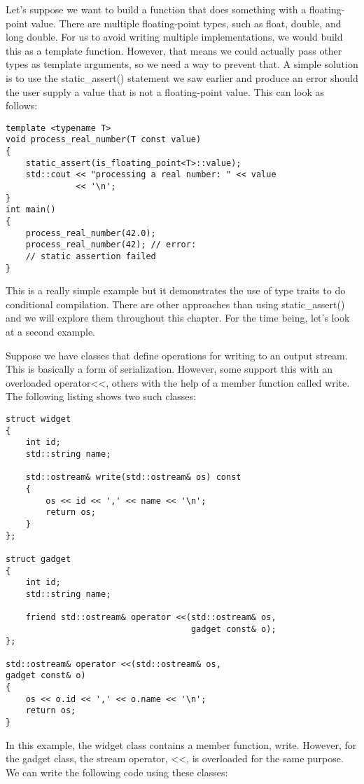 Let’s suppose we want to build a function that does something with a floating-point value. There are multiple floating-point types, such as float, double, and long double. For us to avoid writing multiple implementations, we would build this as a template function. However, that means we could actually pass other types as template arguments, so we need a way to prevent that. A simple solution is to use the static\_assert() statement we saw earlier and produce an error should the user supply a value that is not a floating-point value. This can look as follows:

\begin{lstlisting}[style=styleCXX]
template <typename T>
void process_real_number(T const value)
{
	static_assert(is_floating_point<T>::value);
	std::cout << "processing a real number: " << value
			  << '\n';
}
int main()
{
	process_real_number(42.0);
	process_real_number(42); // error:
	// static assertion failed
}
\end{lstlisting}

This is a really simple example but it demonstrates the use of type traits to do conditional compilation. There are other approaches than using static\_assert() and we will explore them throughout this chapter. For the time being, let’s look at a second example.

Suppose we have classes that define operations for writing to an output stream. This is basically a form of serialization. However, some support this with an overloaded operator<{}<, others with the help of a member function called write. The following listing shows two such classes:

\begin{lstlisting}[style=styleCXX]
struct widget
{
	int id;
	std::string name;
	
	std::ostream& write(std::ostream& os) const
	{
		os << id << ',' << name << '\n';
		return os;
	}
};

struct gadget
{
	int id;
	std::string name;
	
	friend std::ostream& operator <<(std::ostream& os,
	                                 gadget const& o);
};

std::ostream& operator <<(std::ostream& os,
gadget const& o)
{
	os << o.id << ',' << o.name << '\n';
	return os;
}
\end{lstlisting}

In this example, the widget class contains a member function, write. However, for the gadget class, the stream operator, <{}<, is overloaded for the same purpose. We can write the following code using these classes:

